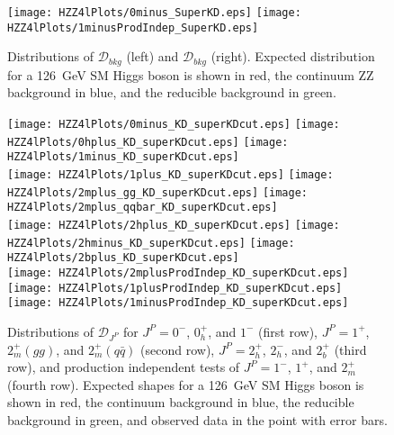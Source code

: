\begin{figure}
\begin{center}
\texttt{[image: HZZ4lPlots/0minus\_SuperKD.eps]}
\texttt{[image: HZZ4lPlots/1minusProdIndep\_SuperKD.eps]}
\caption{Distributions of $\mathscr{D}_{bkg}$
(left) and $\mathscr{D}_{bkg}$ (right).  Expected distribution
for a 126~GeV SM Higgs boson is shown in red, the continuum ZZ
background in blue, and the reducible background in green.}
\label{fig:HZZ4lsuperMELA}
\end{center}
\end{figure}

\begin{figure}
\begin{center}
\texttt{[image: HZZ4lPlots/0minus\_KD\_superKDcut.eps]}
\texttt{[image: HZZ4lPlots/0hplus\_KD\_superKDcut.eps]}
\texttt{[image: HZZ4lPlots/1minus\_KD\_superKDcut.eps]}\\
\texttt{[image: HZZ4lPlots/1plus\_KD\_superKDcut.eps]}
\texttt{[image: HZZ4lPlots/2mplus\_gg\_KD\_superKDcut.eps]}
\texttt{[image: HZZ4lPlots/2mplus\_qqbar\_KD\_superKDcut.eps]}\\
\texttt{[image: HZZ4lPlots/2hplus\_KD\_superKDcut.eps]}
\texttt{[image: HZZ4lPlots/2hminus\_KD\_superKDcut.eps]}
\texttt{[image: HZZ4lPlots/2bplus\_KD\_superKDcut.eps]}\\
\texttt{[image: HZZ4lPlots/2mplusProdIndep\_KD\_superKDcut.eps]}
\texttt{[image: HZZ4lPlots/1plusProdIndep\_KD\_superKDcut.eps]}
\texttt{[image: HZZ4lPlots/1minusProdIndep\_KD\_superKDcut.eps]}
\caption{Distributions of $\mathscr{D}_{J^P}$ for $J^P=0^-$, 
$0_h^+$, and $1^-$ (first row), $J^P=1^+$, $2_m^+(gg)$, and 
$2_m^+(q\bar{q})$ (second row), $J^P=2_h^+$, $2_h^-$, and $2_b^+$ 
(third row), and production independent tests of $J^P=1^-$, $1^+$,
and $2_m^+$ (fourth row).  Expected shapes for a 126~GeV SM Higgs
boson is shown in red, the continuum background in blue, the
reducible background in green, and observed data in the point
with error bars.}
\label{fig:HZZ4ldjp}
\end{center}
\end{figure}

